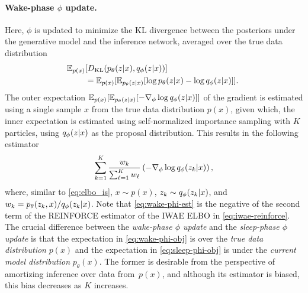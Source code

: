 \paragraph{Wake-phase $\phi$ update.}%
%
\hspace*{-0.5ex}Here, \(\phi\) is updated to minimize the \gls{KL} divergence between the posteriors under the generative model and the inference network, averaged over the true data distribution
%
\begin{align}
  \hspace*{-0.35em}
  \mathbb{E}_{p(x)}&[D_{\mathrm{KL}}(p_\theta(z \lvert x), q_\phi(z \lvert x))] \nonumber \\
  &= \mathbb{E}_{p(x)}[\mathbb{E}_{p_\theta(z \lvert x)}[\log p_\theta(z \lvert x) - \log q_\phi(z \lvert x)]]. \label{eq:wake-phi-obj}
\end{align}
%
The outer expectation $\mathbb{E}_{p(x)}[\mathbb{E}_{p_\theta(z \lvert x)}[-\nabla_\phi \log q_\phi(z \lvert x)]]$ of the gradient is estimated using a single sample $x$ from the true data distribution $p(x)$, given which, the inner expectation is estimated using self-normalized importance sampling with $K$ particles, using $q_\phi(z \lvert x)$ as the proposal distribution.
%
This results in the following estimator
%
\begin{align}
  \sum_{k = 1}^K \frac{w_k}{\sum_{\ell = 1}^K w_\ell} \left(-\nabla_\phi \log q_\phi(z_k \lvert x)\right), \label{eq:wake-phi-est}
\end{align}
%
where, similar to \cref{eq:elbo_is}, $x \sim p(x)$, $z_k \sim q_\phi(z_k \lvert x)$, and $w_k = p_\theta(z_k, x) / q_\phi(z_k \lvert x)$.
%
Note that \cref{eq:wake-phi-est} is the negative of the second term of the \acrshort{REINFORCE} estimator of the \gls{IWAE} \gls{ELBO} in \cref{eq:iwae-reinforce}.
%
The crucial difference between the \emph{wake-phase $\phi$ update} and the \emph{sleep-phase $\phi$ update} is that the expectation in \cref{eq:wake-phi-obj} is over the \emph{true data distribution} $p(x)$ and the expectation in \cref{eq:sleep-phi-obj} is under the \emph{current model distribution} $p_\theta(x)$.
%
The former is desirable from the perspective of amortizing inference over data from~\(p(x)\), and although its estimator is biased, this bias decreases as $K$ increases.



